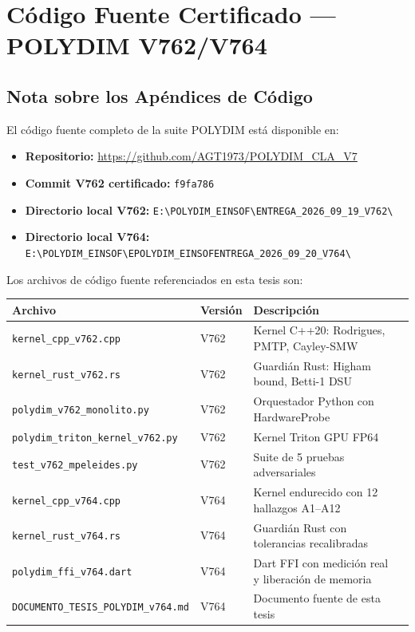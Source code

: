 \chapter{Código Fuente Certificado — POLYDIM V762/V764}


\section*{Nota sobre los Apéndices de Código}

El código fuente completo de la suite POLYDIM está disponible en:
\begin{itemize}
\item \textbf{Repositorio:} \url{https://github.com/AGT1973/POLYDIM_CLA_V7}
\item \textbf{Commit V762 certificado:} \texttt{f9fa786}
\item \textbf{Directorio local V762:} \texttt{E:\textbackslash POLYDIM\_EINSOF\textbackslash ENTREGA\_2026\_09\_19\_V762\textbackslash}
\item \textbf{Directorio local V764:} \texttt{E:\textbackslash POLYDIM\_EINSOF\textbackslash EPOLYDIM\_EINSOFENTREGA\_2026\_09\_20\_V764\textbackslash}
\end{itemize}

Los archivos de código fuente referenciados en esta tesis son:
\begin{tabular}{llll}
\hline
\textbf{Archivo} & \textbf{Versión} & \textbf{Descripción} \\
\hline
\texttt{kernel\_cpp\_v762.cpp} & V762 & Kernel C++20: Rodrigues, PMTP, Cayley-SMW \\
\texttt{kernel\_rust\_v762.rs} & V762 & Guardián Rust: Higham bound, Betti-1 DSU \\
\texttt{polydim\_v762\_monolito.py} & V762 & Orquestador Python con HardwareProbe \\
\texttt{polydim\_triton\_kernel\_v762.py} & V762 & Kernel Triton GPU FP64 \\
\texttt{test\_v762\_mpeleides.py} & V762 & Suite de 5 pruebas adversariales \\
\texttt{kernel\_cpp\_v764.cpp} & V764 & Kernel endurecido con 12 hallazgos A1--A12 \\
\texttt{kernel\_rust\_v764.rs} & V764 & Guardián Rust con tolerancias recalibradas \\
\texttt{polydim\_ffi\_v764.dart} & V764 & Dart FFI con medición real y liberación de memoria \\
\texttt{DOCUMENTO\_TESIS\_POLYDIM\_v764.md} & V764 & Documento fuente de esta tesis \\
\hline


\end{tabular}


